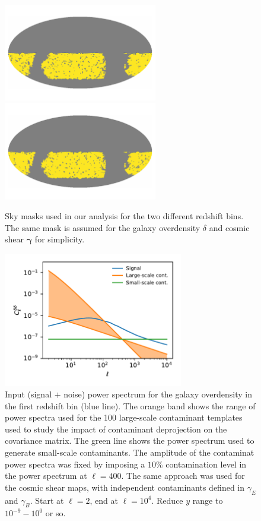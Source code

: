 \documentclass[a4paper,11pt]{article}
\newcommand{\red}[1]{{\color{red} #1}}
\begin{document}
      \begin{figure}
        \centering
        \includegraphics[width=0.6\textwidth]{./figures/mask-lss1.pdf}
        \includegraphics[width=0.6\textwidth]{./figures/mask-lss2.pdf}
        \caption{Sky masks used in our analysis for the two different redshift bins. The same mask is assumed for the galaxy overdensity $\delta$ and cosmic shear $\mathbf{\gamma}$ for simplicity.} \label{fig:mask}
      \end{figure}
      \begin{figure}
        \centering
        \includegraphics[width=0.7\textwidth]{./figures/contaminants_cl.pdf}
        \caption{Input (signal $+$ noise) power spectrum for the galaxy overdensity in the first redshift bin (blue line). The orange band shows the range of power spectra used for the 100 large-scale contaminant templates used to study the impact of contaminant deprojection on the covariance matrix. The green line shows the power spectrum used to generate small-scale contaminants. The amplitude of the contaminat power spectra was fixed by imposing a $10\%$ contamination level in the power spectrum at $\ell=400$. The same approach was used for the cosmic shear maps, with independent contaminants defined in $\gamma_E$ and $\gamma_B$. \red{Start at $\ell=2$, end at $\ell=10^4$. Reduce $y$ range to $10^{-9}-10^0$ or so.}} \label{fig:clcont}
      \end{figure}
\end{document}
